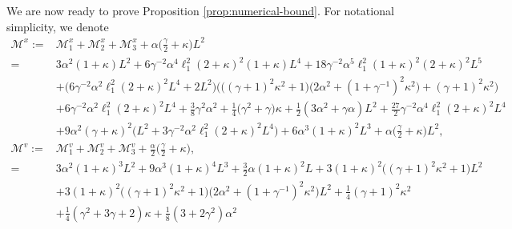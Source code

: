 \documentclass[12pt]{article}
\numberwithin{equation}{section}
\newcommand{\M}{\mathcal{M}}
\begin{document}
We are now ready to prove Proposition \ref{prop:numerical-bound}. 
For notational simplicity, we denote
\begin{align}
\label{eq:M-total-constants}
\M^{x}
:=  &
\M_1^x+\M_2^x+\M_3^x
+
\alpha
\big(
\tfrac{\gamma}{2}+\kappa
\big)L^2
\nonumber \\
=&
3\alpha^2(1+\kappa)L^2
+
6\gamma^{-2}\alpha^4\ell_1^2(2+\kappa)^2(1+\kappa)L^4
+
18\gamma^{-2}\alpha^5
\ell_1^2(1+\kappa)^2(2+\kappa)^2L^5
\nonumber \\
&+
\big(
6\gamma^{-2}\alpha^2\ell_1^2(2+\kappa)^2L^4
+2L^2
\big)
\Big(
\big(
(\gamma+1)^2
\kappa^2+1
\big)
\big(
2\alpha^2
+(1+\gamma^{-1})^2
\kappa^2
\big)
+
(\gamma+1)^2
\kappa^2
\Big)
\nonumber \\
&
+
6\gamma^{-2}\alpha^2\ell_1^2(2+\kappa)^2L^4
+
\tfrac{3}{8}\gamma^2\alpha^2
+
\tfrac{1}{4}
\big(
\gamma^2+\gamma
\big)
\kappa
+
\tfrac{1}{2}
(3\alpha^2+\gamma\alpha)L^2
+
\tfrac{27}{2}
\gamma^{-2}\alpha^4\ell_1^2(2+\kappa)^2L^4
\nonumber \\
&+
9
\alpha^2(\gamma+\kappa)^2
\big(
L^2+3\gamma^{-2}\alpha^2\ell_1^2(2+\kappa)^2L^4
\big)
+
6\alpha^3 (1+\kappa)^2 L^3
+
\alpha
\big(
\tfrac{\gamma}{2}+\kappa
\big)L^2,
\nonumber \\
\M^{v}
:=   &
\M_1^v+\M_2^v+\M_3^v
+
\tfrac{\alpha}{2}
\big(
\tfrac{\gamma}{2}+\kappa
\big),
\nonumber \\
=&
3\alpha^2(1+\kappa)^3 L^2
+
9\alpha^3 (1+\kappa)^4 L^3
+
\tfrac{3}{2}\alpha (1+\kappa)^2 L
+
3(1+\kappa)^2 
\big(
(\gamma+1)^2
\kappa^2
+
1
\big)L^2
\nonumber \\
&
+
3(1+\kappa)^2
\big(
(\gamma+1)^2\kappa^2
+
1
\big)
\big(
2\alpha^2
+
(1+\gamma^{-1})^2
\kappa^2
\big) 
L^2
+
\tfrac{1}{4}(\gamma+1)^2\kappa^2
\nonumber \\
&+
\tfrac{1}{4}(\gamma^2+3\gamma+2)\kappa
+
\tfrac{1}{8}(3+2\gamma^2)\alpha^2

\end{align}
\end{document}
